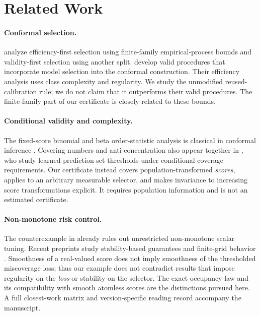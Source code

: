 \documentclass{article}
\begin{document}
\section{Related Work}

\paragraph{Conformal selection.}
\citet{yang2025} analyze efficiency-first selection using finite-family empirical-process bounds and validity-first selection using another split. \citet{liang2026} develop valid procedures that incorporate model selection into the conformal construction. Their efficiency analysis uses class complexity and regularity. We study the unmodified reused-calibration rule; we do not claim that it outperforms their valid procedures. The finite-family part of our certificate is closely related to these bounds.

\paragraph{Conditional validity and complexity.}
The fixed-score binomial and beta order-statistic analysis is classical in conformal inference \citep{vovk2012}. Covering numbers and anti-concentration also appear together in \citet{kiyani2024}, who study learned prediction-set thresholds under conditional-coverage requirements. Our certificate instead covers population-transformed \emph{scores}, applies to an arbitrary measurable selector, and makes invariance to increasing score transformations explicit. It requires population information and is not an estimated certificate.

\paragraph{Non-monotone risk control.}
The counterexample in \citet{crc2024} already rules out unrestricted non-monotone scalar tuning. Recent preprints study stability-based guarantees \citep{angelopoulos2026} and finite-grid behavior \citep{aldirawi2026}. Smoothness of a real-valued score does not imply smoothness of the thresholded miscoverage loss; thus our example does not contradict results that impose regularity on the \emph{loss} or stability on the selector. The exact occupancy law and its compatibility with smooth atomless scores are the distinctions pursued here. A full closest-work matrix and version-specific reading record accompany the manuscript.
\end{document}
